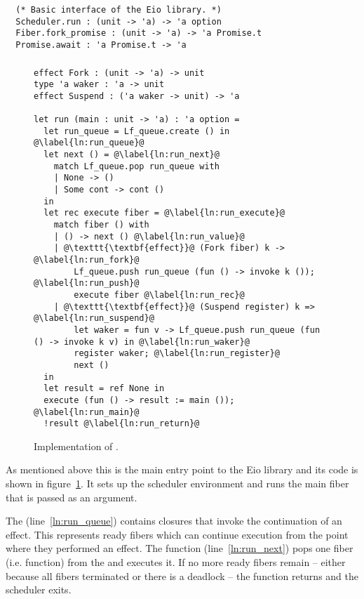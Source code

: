 \begin{verbatim}
  (* Basic interface of the Eio library. *)
  Scheduler.run : (unit -> 'a) -> 'a option
  Fiber.fork_promise : (unit -> 'a) -> 'a Promise.t
  Promise.await : 'a Promise.t -> 'a
\end{verbatim}

\subsubsection{}
\label{sec:sched-impl-run}

\begin{figure}[ht]
  \begin{verbatim}
effect Fork : (unit -> 'a) -> unit
type 'a waker : 'a -> unit
effect Suspend : ('a waker -> unit) -> 'a

let run (main : unit -> 'a) : 'a option =
  let run_queue = Lf_queue.create () in @\label{ln:run_queue}@
  let next () = @\label{ln:run_next}@
    match Lf_queue.pop run_queue with
    | None -> ()
    | Some cont -> cont () 
  in
  let rec execute fiber = @\label{ln:run_execute}@
    match fiber () with
    | () -> next () @\label{ln:run_value}@
    | @\texttt{\textbf{effect}}@ (Fork fiber) k -> @\label{ln:run_fork}@
        Lf_queue.push run_queue (fun () -> invoke k ()); @\label{ln:run_push}@
        execute fiber @\label{ln:run_rec}@
    | @\texttt{\textbf{effect}}@ (Suspend register) k => @\label{ln:run_suspend}@
        let waker = fun v -> Lf_queue.push run_queue (fun () -> invoke k v) in @\label{ln:run_waker}@ 
        register waker; @\label{ln:run_register}@
        next ()
  in
  let result = ref None in
  execute (fun () -> result := main ()); @\label{ln:run_main}@
  !result @\label{ln:run_return}@
  \end{verbatim}
  \caption{Implementation of .}
  \label{fig:sched-impl-run}
\end{figure}

As mentioned above this is the main entry point to the Eio library and its code is shown in figure~\ref{fig:sched-impl-run}.
It sets up the scheduler environment and runs the main fiber that is passed as an argument.

The  (line~\ref{ln:run_queue}) contains closures that invoke the continuation of an effect.
This represents ready fibers which can continue execution from the point where they performed an effect.
The  function (line~\ref{ln:run_next}) pops one fiber (i.e. function) from the  and executes it.
If no more ready fibers remain -- either because all fibers terminated or there is a deadlock -- the  function returns and the scheduler exits.

